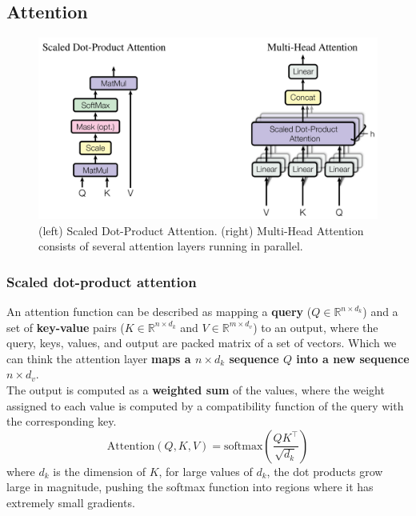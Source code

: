 \documentclass[a3paper, 12pt]{book} %
\newcommand\bolden[1]{{\boldmath\bfseries#1}}
\begin{document}
\subsection{Attention}
\begin{figure}[htpb]
	\centering
	\includegraphics[width=\linewidth]{figures/attention_transformer.png}
	\caption{(left) Scaled Dot-Product Attention. (right) Multi-Head Attention consists of several attention layers running in parallel.}
	\label{fig:boat1}
\end{figure}

\subsubsection{Scaled dot-product attention}
An attention function can be described as mapping a \textbf{query} ($Q \in \mathbb{R}^{n\times d_k}$) and a set of \textbf{key-value} pairs ($K \in \mathbb{R}^{n\times d_k} $ and $V \in \mathbb{R}^{m \times d_v}$) to an output, where the query, keys, values, and output are packed matrix of a set of vectors. Which we can think the attention layer \bolden{maps a $n\times d_k$ sequence $Q$  into a new sequence $n \times d_v$}. \\

The output is computed as a \textbf{weighted sum} of the values, where the weight assigned to each value is computed by a compatibility function of the query with the corresponding key.
\begin{equation}
\text{Attention}{(Q,K,V)}= \text{softmax}{(\frac{QK^{\top}}{\sqrt{d_k}})}
\end{equation}
where $d_k$ is the dimension of $K$, for large values of $d_k$, the dot products grow large in magnitude, pushing the softmax function into regions where it has extremely small gradients.
\end{document}
